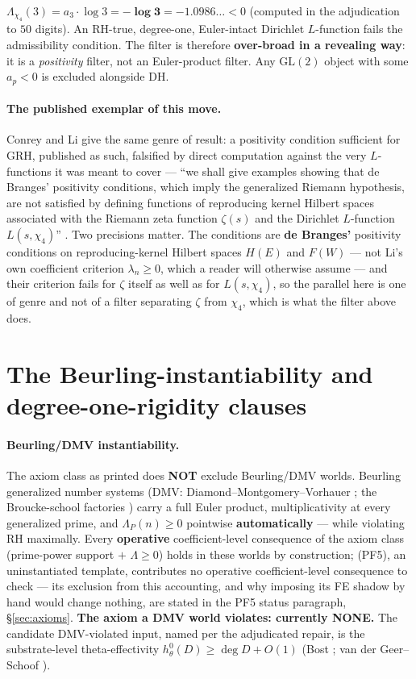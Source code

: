 \documentclass[11pt]{article}
\theoremstyle{plain}
\theoremstyle{definition}
\theoremstyle{remark}
\begin{document}
$\Lambda_{\chi_4}(3) = a_3 \cdot \log 3 = \mathbf{-\log 3 = -1.0986\ldots}
< 0$ (computed in the adjudication to $50$ digits). An RH-true, degree-one,
Euler-intact Dirichlet $L$-function fails the admissibility condition. The
filter is therefore \textbf{over-broad in a revealing way}: it is a
\emph{positivity} filter, not an Euler-product filter. Any $\mathrm{GL}(2)$
object with some $a_p < 0$ is excluded alongside DH.

\paragraph{The published exemplar of this move.} Conrey and Li \cite{CL00} give
the same genre of result: a positivity condition sufficient for GRH, published as
such, falsified by direct computation against the very $L$-functions it was meant to
cover --- ``we shall give examples showing that de Branges' positivity conditions,
which imply the generalized Riemann hypothesis, are not satisfied by defining
functions of reproducing kernel Hilbert spaces associated with the Riemann zeta
function $\zeta(s)$ and the Dirichlet $L$-function $L(s, \chi_4)$''
\cite[introduction]{CL00}. Two precisions matter. The conditions are
\textbf{de Branges'} positivity conditions on reproducing-kernel Hilbert spaces
$H(E)$ and $F(W)$ --- not Li's own coefficient criterion $\lambda_n \ge 0$, which
a reader will otherwise assume --- and their criterion fails for $\zeta$ itself as
well as for $L(s, \chi_4)$, so the parallel here is one of genre and not of a
filter separating $\zeta$ from $\chi_4$, which is what the filter above does.

\section{The Beurling-instantiability and degree-one-rigidity
clauses}\label{sec:clauses}

\paragraph{Beurling/DMV instantiability.} The axiom class as printed does
\textbf{NOT} exclude Beurling/DMV worlds. Beurling generalized number systems
(DMV: Diamond--Montgomery--Vorhauer \cite{DMV}; the Broucke-school factories
\cite{BDR, Br, BV}) carry a full Euler product, multiplicativity at every
generalized prime, and $\Lambda_P(n) \ge 0$ pointwise \textbf{automatically}
--- while violating RH maximally. Every \textbf{operative} coefficient-level
consequence of the axiom class (prime-power support $+$ $\Lambda \ge 0$) holds
in these worlds by construction; (PF5), an uninstantiated template, contributes
no operative coefficient-level consequence to check --- its exclusion from this
accounting, and why imposing its FE shadow by hand would change nothing, are
stated in the PF5 status paragraph, \S\ref{sec:axioms}. \textbf{The axiom a
DMV world violates: currently NONE.} The candidate DMV-violated input, named
per the adjudicated repair, is the substrate-level theta-effectivity
$h^0_\theta(D) \ge \deg D + O(1)$ (Bost \cite{Bost}; van der Geer--Schoof
\cite{vdGS}).
\end{document}
